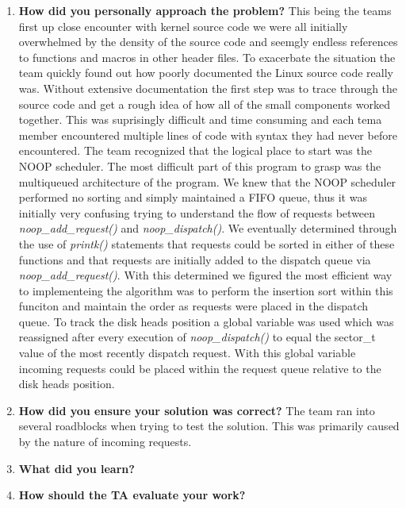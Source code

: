 \documentclass[10pt,onecolumn,draftclsnofoot]{IEEEtran} %
\begin{document}
\begin{singlespace}
\begin{enumerate}
	\item \textbf{How did you personally approach the problem?}
	\normalfont \indent This being the teams first up close encounter with kernel source code we were all initially overwhelmed by the density of the source code and seemgly endless references to functions and macros in other header files. To exacerbate the situation the team quickly found out how poorly documented the Linux source code really was. Without extensive documentation the first step was to trace through the source code and get a rough idea of how all of the small components worked together. This was suprisingly difficult and time consuming and each tema member encountered multiple lines of code with syntax they had never before encountered. 
	\normalfont \indent The team recognized that the logical place to start was the NOOP scheduler. The most difficult part of this program to grasp was the multiqueued architecture of the program. We knew that the NOOP scheduler performed no sorting and simply maintained a FIFO queue, thus it was initially very confusing trying to understand the flow of requests between \textit{noop\_add\_request()} and \textit{noop\_dispatch()}. We eventually determined through the use of \textit{printk()} statements that requests could be sorted in either of these functions and that requests are initially added to the dispatch queue via \textit{noop\_add\_request()}. With this determined we figured the most efficient way to implementeing the algorithm was to perform the insertion sort within this funciton and maintain the order as requests were placed in the dispatch queue. To track the disk heads position a global variable was used which was reassigned after every execution of \textit{noop\_dispatch()} to equal the sector\_t value of the most recently dispatch request. With this global variable incoming requests could be placed within the request queue relative to the disk heads position.


	\item \textbf{How did you ensure your solution was correct?}
	\normalfont \indent The team ran into several roadblocks when trying to test the solution. This was primarily caused by the nature of incoming requests. 

	\item \textbf{What did you learn?}
	\normalfont \indent

	\item \textbf{How should the TA evaluate your work?}
	\normalfont \indent	


\end{enumerate}
\end{singlespace}
\end{document}
